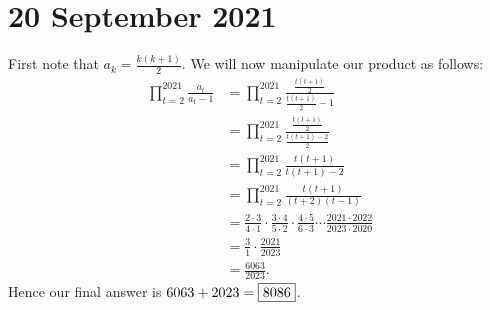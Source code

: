 \documentclass[letterpaper,oneside]{scrartcl}
\begin{document}
\section*{20 September 2021}
First note that \(a_k=\frac{k(k+1)}{2}\). We will now manipulate our product as follows:
\begin{align*}
    \prod_{t=2}^{2021} \frac{a_t}{a_t-1} &= \prod_{t=2}^{2021} \frac{\tfrac{t(t+1)}{2}}{\tfrac{t(t+1)}{2}-1}\\
    &= \prod_{t=2}^{2021} \frac{\tfrac{t(t+1)}{2}}{\tfrac{t(t+1)-2}{2}}\\
    &= \prod_{t=2}^{2021} \frac{t(t+1)}{t(t+1)-2}\\
    &= \prod_{t=2}^{2021} \frac{t(t+1)}{(t+2)(t-1)}\\
    &= \frac{2\cdot3}{4\cdot1}\cdot\frac{3\cdot4}{5\cdot2}\cdot\frac{4\cdot5}{6\cdot3}\cdots\frac{2021\cdot2022}{2023\cdot2020}\\
    &= \frac{3}{1}\cdot\frac{2021}{2023}\\
    &= \frac{6063}{2023}.
\end{align*}
Hence our final answer is \(6063+2023 = \fbox{8086}\).
\end{document}
